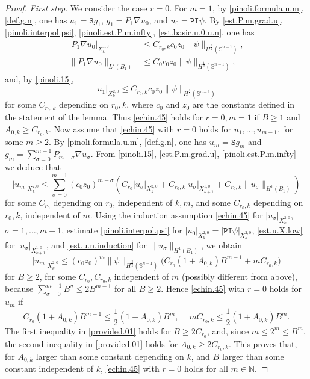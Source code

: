 \documentclass[10pt,reqno,a4paper]{article}
\numberwithin{equation}{section}
\theoremstyle{plain}
\theoremstyle{definition}
\newcommand{\N}{{\mathbb N}}
\renewcommand{\S}{{\mathbb S}}
\newcommand{\grad}{\nabla}
\begin{document}
\begin{proof} 
\emph{First step}. 
We consider the case $r=0$. 
For $m=1$, by 
\eqref{pinoli.formula.u.m}, 
\eqref{def.g.n}, one has 
$u_1 = \mathtt{S} g_1$, $g_1 = P_1 \grad u_0$,  
and $u_0 = \mathtt{PI} \psi$. 
By 
\eqref{est.P.m.grad.u},
\eqref{pinoli.interpol.psi},  
\eqref{pinoli.est.P.m.infty},
\eqref{est.basic.u.0.u.n}, 
one has 
\begin{align} 
|P_1 \grad u_0|_{X^{1,0}_k} 
& \leq C_{r_0,k} c_0 z_0 \| \psi \|_{H^{\frac32}(\S^{n-1})}, 
\label{pinoli.50}
\\
\| P_1 \grad u_0 \|_{L^2(B_1)} 
& \leq C_0 c_0 z_0 \| \psi \|_{H^{\frac12}(\S^{n-1})},  
\label{pinoli.51}
\end{align}
and, by \eqref{pinoli.15},
\[
|u_1|_{X^{2,0}_k} \leq C_{r_0,k} c_0 z_0 \| \psi \|_{H^{\frac32}(\S^{n-1})}
\]
for some $C_{r_0,k}$ depending on $r_0,k$, 
where $c_0$ and $z_0$ are the constants defined in the statement of the lemma. 
Thus \eqref{echin.45} holds for $r=0, m=1$ if $B \geq 1$ and $A_{0,k} \geq C_{r_0,k}$.
Now assume that \eqref{echin.45} with $r=0$ holds for $u_1, \ldots, u_{m-1}$, for some $m \geq 2$. 
By \eqref{pinoli.formula.u.m}, \eqref{def.g.n}, one has 
$u_m = \mathtt{S} g_m$ and 
$g_m = \sum_{\sigma=0}^{m-1} P_{m-\sigma} \grad u_\sigma$. 
From \eqref{pinoli.15},
\eqref{est.P.m.grad.u},
\eqref{pinoli.est.P.m.infty} we deduce that 
\[
|u_m|_{X^{2,0}_k} 
\leq \sum_{\sigma = 0}^{m-1} (c_0 z_0)^{m-\sigma} 
(C_{r_0} |u_\sigma|_{X^{2,0}_k} + C_{r_0,k} |u_\sigma|_{X^{1,0}_{k+1}} 
+ C_{r_0,k} \| u_\sigma \|_{H^1(B_1)})
\]
for some $C_{r_0}$ depending on $r_0$, independent of $k,m$, 
and some $C_{r_0,k}$ depending on $r_0, k$, independent of $m$. 
Using the induction assumption \eqref{echin.45} for $|u_\sigma|_{X^{2,0}_k}$, $\sigma = 1, \ldots, m-1$, 
estimate \eqref{pinoli.interpol.psi} for $|u_0|_{X^{2,0}_k} = |\mathtt{PI} \psi|_{X^{2,0}_k}$, 
\eqref{est.u.X.low} for $|u_\sigma|_{X^{1,0}_{k+1}}$,  
and \eqref{est.u.n.induction} for $\| u_\sigma \|_{H^1(B_1)}$, we obtain 
\[
|u_m|_{X^{2,0}_k}  
\leq (c_0 z_0)^m \| \psi \|_{H^{\frac32}(\S^{n-1})} 
\big( C_{r_0} (1+A_{0,k}) B^{m-1} + m C_{r_0,k} \big)
\]
for $B \geq 2$, 
for some $C_{r_0}, C_{r_0,k}$ independent of $m$ (possibly different from above), 
because $\sum_{\sigma=0}^{m-1} B^\sigma \leq 2 B^{m-1}$ for all $B \geq 2$. 
Hence \eqref{echin.45} with $r=0$ holds for $u_m$ if 
\begin{equation}  \label{provided.01}
C_{r_0} (1+A_{0,k}) B^{m-1} \leq \frac12 (1+A_{0,k}) B^m, \quad \ 
m C_{r_0,k} \leq \frac12 (1+A_{0,k}) B^m.
\end{equation}
The first inequality in \eqref{provided.01} holds for $B \geq 2 C_{r_0}$, 
and, since $m \leq 2^m \leq B^m$, 
the second inequality in \eqref{provided.01} holds for $A_{0,k} \geq 2 C_{r_0,k}$. 
This proves that, for $A_{0,k}$ larger than some constant depending on $k$, 
and $B$ larger than some constant independent of $k$, 
\eqref{echin.45} with $r=0$ holds for all $m \in \N$. 


\end{proof}
\end{document}
